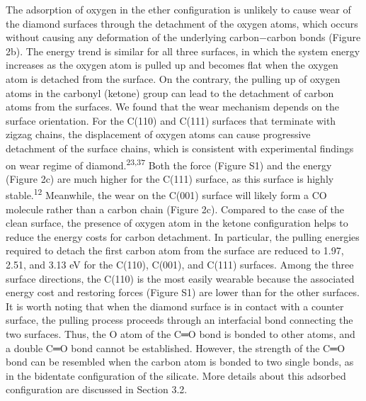 \documentclass{article}
\begin{document}

The adsorption of oxygen in the ether configuration is unlikely to cause wear of the diamond surfaces through the detachment of the oxygen atoms, which occurs without causing any deformation of the underlying carbon−carbon bonds (Figure 2b). The energy trend is similar for all three surfaces, in which the system energy increases as the oxygen atom is pulled up and becomes flat when the oxygen atom is detached from the surface. On the contrary, the pulling up of oxygen atoms in the carbonyl (ketone) group can lead to the detachment of carbon atoms from the surfaces. We found that the wear mechanism depends on the surface orientation. For the C(110) and C(111) surfaces that terminate with zigzag chains, the displacement of oxygen atoms can cause progressive detachment of the surface chains, which is consistent with experimental findings on wear regime of diamond.\textsuperscript{23,37} Both the force (Figure S1) and the energy (Figure 2c) are much higher for the C(111) surface, as this surface is highly stable.\textsuperscript{12} Meanwhile, the wear on the C(001) surface will likely form a CO molecule rather than a carbon chain (Figure 2c). Compared to the case of the clean surface, the presence of oxygen atom in the ketone configuration helps to reduce the energy costs for carbon detachment. In particular, the pulling energies required to detach the first carbon atom from the surface are reduced to 1.97, 2.51, and 3.13 eV for the C(110), C(001), and C(111) surfaces. Among the three surface directions, the C(110) is the most easily wearable because the associated energy cost and restoring forces (Figure S1) are lower than for the other surfaces. It is worth noting that when the diamond surface is in contact with a counter surface, the pulling process proceeds through an interfacial bond connecting the two surfaces. Thus, the O atom of the C═O bond is bonded to other atoms, and a double C═O bond cannot be established. However, the strength of the C═O bond can be resembled when the carbon atom is bonded to two single bonds, as in the bidentate configuration of the silicate. More details about this adsorbed configuration are discussed in Section 3.2.
\end{document}
